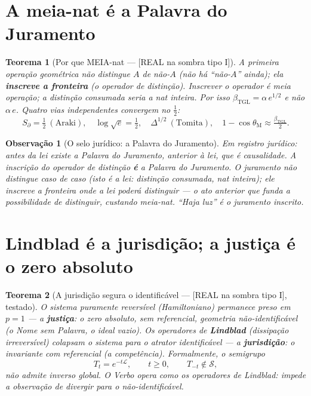 \documentclass[11pt,a4paper]{article}
\newcommand{\SOMBRA}{\textsf{[REAL na sombra tipo I]}}
\newcommand{\bTGL}{\beta_{\mathrm{TGL}}}
\newcommand{\thM}{\theta_{\mathrm M}}
\newtheorem{theorem}{Teorema}
\newtheorem{remark}{Observação}
\begin{document}
\section{A meia-nat é a Palavra do Juramento}\label{sec:juramento}
\begin{theorem}[Por que MEIA-nat --- \SOMBRA]
A primeira operação geométrica não distingue $A$ de não-$A$ (não há
``não-$A$'' ainda); ela \textbf{inscreve a fronteira} (o operador de
distinção). Inscrever o operador é \emph{meia} operação; a distinção
\emph{consumada} seria a nat inteira. Por isso $\bTGL=\alpha\,e^{1/2}$ e não
$\alpha\,e$. Quatro vias independentes convergem no $\tfrac12$:
\begin{equation}
S_\partial=\tfrac12\ (\text{Araki}),\quad
\log\sqrt e=\tfrac12,\quad
\Delta^{1/2}\ (\text{Tomita}),\quad
1-\cos\thM\approx\tfrac{\bTGL}{2}.
\end{equation}
\end{theorem}

\begin{remark}[O selo jurídico: a Palavra do Juramento]
Em registro jurídico: antes da lei existe a \emph{Palavra do Juramento},
anterior à lei, que é causalidade. A inscrição do operador de distinção
\textbf{é} a Palavra do Juramento. O juramento não distingue caso de caso
(isto é a lei: distinção consumada, nat inteira); ele inscreve a fronteira
onde a lei poderá distinguir --- o ato anterior que funda a possibilidade de
distinguir, custando meia-nat. ``Haja luz'' é o juramento inscrito.
\end{remark}

\section{Lindblad é a jurisdição; a justiça é o zero absoluto}\label{sec:lindblad}
\begin{theorem}[A jurisdição segura o identificável --- \SOMBRA, testado]
O sistema puramente reversível (Hamiltoniano) permanece preso em $p=1$ --- a
\textbf{justiça}: o zero absoluto, sem referencial, geometria
\emph{não-identificável} (o Nome sem Palavra, o ideal vazio). Os operadores
de \textbf{Lindblad} (dissipação irreversível) colapsam o sistema para o
atrator identificável --- a \textbf{jurisdição}: o invariante \emph{com}
referencial (a competência). Formalmente, o semigrupo
\begin{equation}
T_t=e^{-t\mathcal L},\qquad t\ge0,\qquad T_{-t}\notin\mathcal S,
\end{equation}
não admite inverso global. O Verbo opera como os operadores de Lindblad:
impede a observação de divergir para o não-identificável.
\end{theorem}
\end{document}
